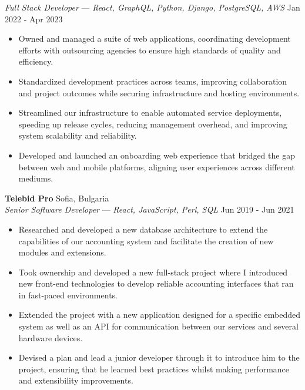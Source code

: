 \documentclass[a4paper]{article}
\begin{document}
\textit{Full Stack Developer} — {\sl React, GraphQL, Python, Django, PostgreSQL, AWS} \hfill Jan 2022 - Apr 2023\\
\vspace{-1mm}
\begin{itemize} \itemsep 1pt
    \item Owned and managed a suite of web applications, coordinating development efforts with outsourcing agencies to ensure high standards of quality and efficiency.
    \item Standardized development practices across teams, improving collaboration and project outcomes while securing infrastructure and hosting environments.
    \item Streamlined our infrastructure to enable automated service deployments, speeding up release cycles, reducing management overhead, and improving system scalability and reliability.
    \item Developed and launched an onboarding web experience that bridged the gap between web and mobile platforms, aligning user experiences across different mediums.
\end{itemize}



\textbf{Telebid Pro} \hfill Sofia, Bulgaria\\
\textit{Senior Software Developer}  — {\sl React, JavaScript, Perl, SQL}  \hfill Jun 2019 - Jun 2021\\
\vspace{-1mm}
\begin{itemize} \itemsep 1pt
    \item Researched and developed a new database architecture to extend the capabilities of our accounting system and facilitate the creation of new modules and extensions.
    \item Took ownership and developed a new full-stack project where I introduced new front-end technologies to develop reliable accounting interfaces that ran in fast-paced environments.
    \item Extended the project with a new application designed for a specific embedded system as well as an API for communication between our services and several hardware devices.
    \item Devised a plan and lead a junior developer through it to introduce him to the project, ensuring that he learned best practices whilst making performance and extensibility improvements.
\end{itemize}
\end{document}
